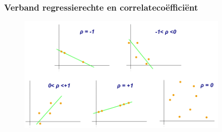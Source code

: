 \documentclass{beamer}
\begin{document}
\begin{frame}
  \frametitle{Verband regressierechte en correlateco\"effici\"ent}

  \begin{figure}
    \centering
    \includegraphics[width=0.90\textwidth]{img/les3-regressie.png}
    \label{fig:les3-regressie}
  \end{figure}

\end{frame}

\end{document}
